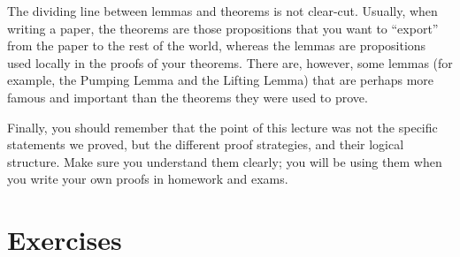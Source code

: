 \documentclass[11pt]{article}
\begin{document}
The dividing line between lemmas and theorems is not clear-cut.
Usually, when writing a paper, the theorems are those propositions
that you want to ``export'' from the paper to the rest of the world,
whereas the lemmas are propositions used locally in the proofs of your
theorems. There are, however, some lemmas (for example, the Pumping
Lemma and the Lifting Lemma) that are perhaps more famous and
important than the theorems they were used to prove.
\par\nobreak
Finally, you should remember that the point of this lecture was
not the specific statements we proved, but the different proof
strategies, and their logical structure. Make sure you understand
them clearly; you will be using them when you write your own
proofs in homework and exams.

\section{Exercises}\label{scn:exercises}
\end{document}
